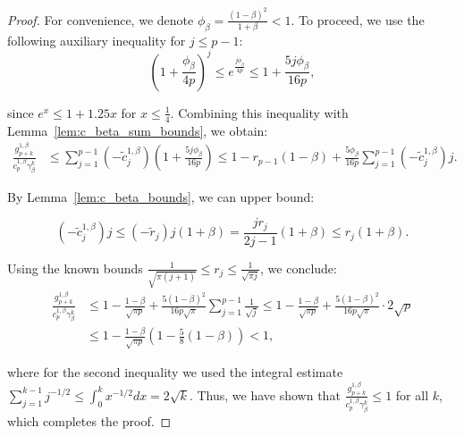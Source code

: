 \documentclass{article} %
\begin{document}
\begin{proof}
For convenience, we denote $\phi_{\beta} = \frac{(1 - \beta)^2}{1 + \beta} < 1$. To proceed, we use the following auxiliary inequality for $j \le p - 1$:
%
\begin{equation}
    \left(1 + \frac{\phi_{\beta}}{4p}\right)^j \le e^{\frac{j\phi_{\beta}}{4p}} \le 1 + \frac{5j \phi_{\beta}}{16p},
\end{equation}

since $e^{x} \le 1 + 1.25x$ for $x \le \frac{1}{4}$. Combining this inequality with Lemma~\ref{lem:c_beta_sum_bounds}, we obtain:
\begin{equation}
\begin{aligned}
    \frac{g^{1, \beta}_{p +k}}{c^{1, \beta}_p \gamma_{\beta}^k} &\le \sum\limits_{j = 1}^{p - 1}(-\tilde{c}^{1, \beta}_j) \left(1 + \frac{5j \phi_{\beta}}{16p}\right) \le 1 - r_{p - 1}(1 - \beta) + \frac{5\phi_{\beta}}{16p} \sum\limits_{j = 1}^{p - 1} (-\tilde{c}^{1, \beta}_j) j.
\end{aligned}
\end{equation}

By Lemma~\ref{lem:c_beta_bounds}, we can upper bound:

\begin{equation}
    (-\tilde{c}^{1, \beta}_j)j \le (-\tilde{r}_j)j(1 + \beta) = \frac{jr_j}{2j - 1}(1 + \beta) \le r_j (1 + \beta).
\end{equation}

Using the known bounds $\frac{1}{\sqrt{\pi (j + 1)}} \le r_j \le \frac{1}{\sqrt{\pi j}}$, we conclude:
\begin{equation}
\begin{aligned}
    \frac{g^{1, \beta}_{p +k}}{c^{1, \beta}_p \gamma_{\beta}^k} &\le 1 - \frac{1 - \beta}{\sqrt{\pi p}} + \frac{5 (1 - \beta)^2}{16p\sqrt{\pi}} \sum\limits_{j = 1}^{p - 1}\frac{1}{\sqrt{j}} \le 1 - \frac{1 - \beta}{\sqrt{\pi p}} + \frac{5(1 - \beta)^2}{16p\sqrt{\pi}} \cdot 2\sqrt{p} \\
    &\le 1 - \frac{1 - \beta}{\sqrt{\pi p}} \left(1 - \frac{5}{8}(1 - \beta)\right) < 1,
\end{aligned}
\end{equation}

where for the second inequality we used the integral estimate $\sum_{j = 1}^{k - 1} j^{-1/2} \le \int_{0}^{k} x^{-1/2} dx = 2\sqrt{k}$. Thus, we have shown that $\frac{g^{1, \beta}_{p +k}}{c^{1, \beta}_p \gamma_{\beta}^k} \le 1$ for all $k$, which completes the proof.
\end{proof}
\end{document}
